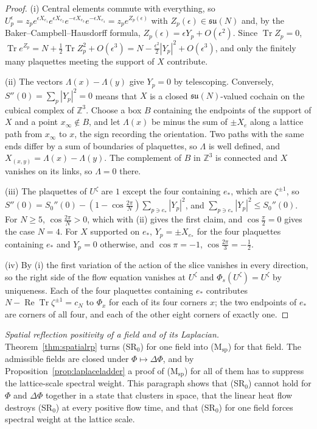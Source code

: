 \documentclass[aps,prd,twocolumn,superscriptaddress,nofootinbib,longbibliography,floatfix,amsmath,amssymb,10pt]{revtex4-2}
\theoremstyle{definition}
\theoremstyle{remark}
\newcommand{\Z}{\mathbb{Z}}
\newcommand{\Tr}{\operatorname{Tr}}
\newcommand{\ReTr}{\operatorname{Re}\operatorname{Tr}}
\begin{document}
\begin{proof}
(i) Central elements commute with everything, so $U^\epsilon_p=z_p
e^{\epsilon X_{e_1}}e^{\epsilon X_{e_2}}e^{-\epsilon X_{e_3}}e^{-\epsilon
X_{e_4}}=z_pe^{Z_p(\epsilon)}$ with $Z_p(\epsilon)\in\mathfrak{su}(N)$ and,
by the Baker--Campbell--Hausdorff formula, $Z_p(\epsilon)=\epsilon Y_p+
O(\epsilon^2)$. Since $\Tr Z_p=0$, $\Tr e^{Z_p}=N+\frac12\Tr Z_p^2+
O(\epsilon^3)=N-\frac{\epsilon^2}2|Y_p|^2+O(\epsilon^3)$, and only the
finitely many plaquettes meeting the support of $X$ contribute.

(ii) The vectors $\Lambda(x)-\Lambda(y)$ give $Y_p=0$ by telescoping.
Conversely, $S''(0)=\sum_p|Y_p|^2=0$ means that $X$ is a closed
$\mathfrak{su}(N)$-valued cochain on the cubical complex of $\Z^3$. Choose
a box $B$ containing the endpoints of the support of $X$ and a point
$x_\infty\notin B$, and let $\Lambda(x)$ be minus the sum of $\pm X_e$ along
a lattice path from $x_\infty$ to $x$, the sign recording the orientation.
Two paths with the same ends differ by a sum of boundaries of plaquettes, so
$\Lambda$ is well defined, and $X_{(x,y)}=\Lambda(x)-\Lambda(y)$. The
complement of $B$ in $\Z^3$ is connected and $X$ vanishes on its links, so
$\Lambda=0$ there.

(iii) The plaquettes of $U^\zeta$ are $1$ except the four containing
$e_*$, which are $\zeta^{\pm1}$, so $S''(0)=S_0''(0)-(1-\cos\frac{2\pi}N)
\sum_{p\ni e_*}|Y_p|^2$, and $\sum_{p\ni e_*}|Y_p|^2\le S_0''(0)$. For
$N\ge5$, $\cos\frac{2\pi}N>0$, which with (ii) gives the first claim, and
$\cos\frac\pi2=0$ gives the case $N=4$. For $X$ supported on $e_*$,
$Y_p=\pm X_{e_*}$ for the four plaquettes containing $e_*$ and $Y_p=0$
otherwise, and $\cos\pi=-1$, $\cos\frac{2\pi}3=-\frac12$.

(iv) By (i) the first variation of the action of the slice vanishes in
every direction, so the right side of the flow equation vanishes at
$U^\zeta$ and $\Phi_s(U^\zeta)=U^\zeta$ by uniqueness. Each of the four
plaquettes containing $e_*$ contributes $N-\ReTr\zeta^{\pm1}=c_N$ to
$\Phi_x$ for each of its four corners $x$; the two endpoints of $e_*$ are
corners of all four, and each of the other eight corners of exactly one.
\end{proof}

\emph{Spatial reflection positivity of a field and of its Laplacian.}
Theorem~\ref{thm:spatialrp} turns (SR$_0$) for one field into
(M$_{\mathrm{sp}}$) for that field. The admissible fields are closed under
$\Phi\mapsto\Delta\Phi$, and by Proposition~\ref{prop:laplaceladder} a proof
of (M$_{\mathrm{sp}}$) for all of them has to suppress the lattice-scale
spectral weight. This paragraph shows that (SR$_0$) cannot hold for $\Phi$
and $\Delta\Phi$ together in a state that clusters in space, that the linear
heat flow destroys (SR$_0$) at every positive flow time, and that (SR$_0$) for
one field forces spectral weight at the lattice scale.
\end{document}
